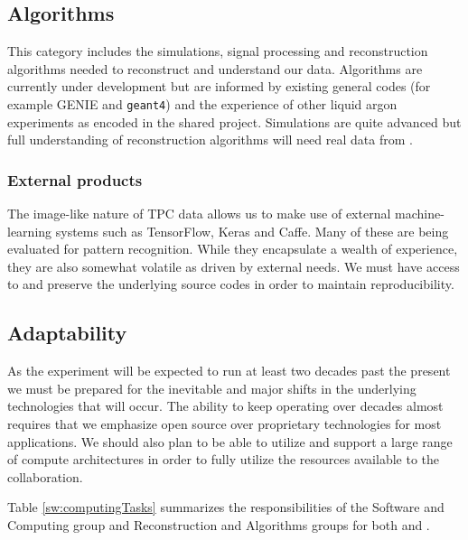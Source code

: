\subsection{Algorithms}
This category includes the simulations, signal processing and reconstruction algorithms needed to reconstruct and understand our data. Algorithms are currently under development but are  informed by existing general codes (for example GENIE and {\tt geant4}) and the experience of other liquid argon experiments as encoded in the shared   project.  Simulations are quite advanced but full understanding of reconstruction algorithms will need real data from . 

\subsubsection{External products}
The image-like nature of TPC data allows us to make use of external machine-learning systems such as TensorFlow\cite{DBLP:journals/corr/AbadiABBCCCDDDG16}, 
Keras\cite{chollet2015keras} and Caffe\cite{Jia:2014:CCA:2647868.2654889}.  Many of these are being evaluated for pattern recognition. While they encapsulate a wealth of experience, they are also somewhat volatile as driven by external needs.  We must have access to and preserve the underlying source codes in order to maintain reproducibility. 



\subsection{Adaptability}
As the experiment will be expected to run at least two decades past the present we must be prepared for the inevitable and major shifts in the underlying technologies that will occur. The ability to keep operating over decades almost requires that we emphasize open source over proprietary technologies for most applications.  We should also plan to be able to utilize and support a large range of compute architectures in order to fully utilize the resources available to the collaboration.


Table \ref{sw:computingTasks} summarizes the responsibilities of the Software and Computing group and Reconstruction and Algorithms groups for both  and .

